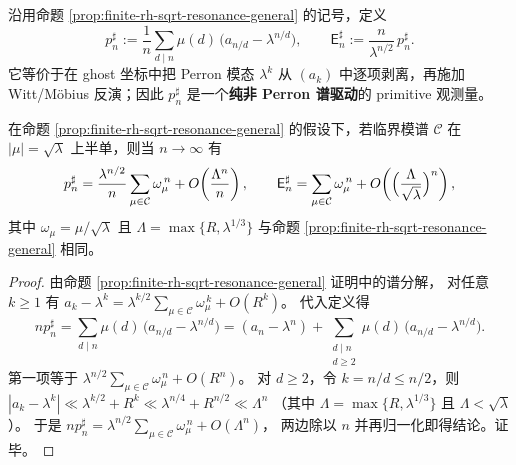 \begin{definition}\label{def:primitive-sharp}
沿用命题 \ref{prop:finite-rh-sqrt-resonance-general} 的记号，定义
\[
p_n^\sharp
:=\frac{1}{n}\sum_{d\mid n}\mu(d)\,\bigl(a_{n/d}-\lambda^{n/d}\bigr),
\qquad
\mathsf{E}_n^\sharp
:=\frac{n}{\lambda^{n/2}}\,p_n^\sharp.
\]
它等价于在 ghost 坐标中把 Perron 模态 \(\lambda^k\) 从 \((a_k)\) 中逐项剥离，再施加 Witt/Möbius 反演；因此 \(p_n^\sharp\) 是一个\textbf{纯非 Perron 谱驱动}的 primitive 观测量。
\end{definition}

\begin{proposition}\label{prop:primitive-sharp-phase-limit}
在命题 \ref{prop:finite-rh-sqrt-resonance-general} 的假设下，若临界模谱 \(\mathcal{C}\) 在 \(|\mu|=\sqrt{\lambda}\) 上半单，则当 \(n\to\infty\) 有
\[
p_n^\sharp
=\frac{\lambda^{n/2}}{n}\sum_{\mu\in\mathcal{C}}\omega_\mu^{\,n}
+O\!\left(\frac{\Lambda^n}{n}\right),
\qquad
\mathsf{E}_n^\sharp
=\sum_{\mu\in\mathcal{C}}\omega_\mu^{\,n}
+O\!\left(\Bigl(\frac{\Lambda}{\sqrt{\lambda}}\Bigr)^n\right),
\]
其中 \(\omega_\mu=\mu/\sqrt{\lambda}\) 且 \(\Lambda=\max\{R,\lambda^{1/3}\}\) 与命题 \ref{prop:finite-rh-sqrt-resonance-general} 相同。
\end{proposition}
\begin{proof}
由命题 \ref{prop:finite-rh-sqrt-resonance-general} 证明中的谱分解，
对任意 \(k\ge 1\) 有
\(
a_k-\lambda^k=\lambda^{k/2}\sum_{\mu\in\mathcal{C}}\omega_\mu^{\,k}+O(R^k)
\)。
代入定义得
\[
np_n^\sharp=\sum_{d\mid n}\mu(d)\,\bigl(a_{n/d}-\lambda^{n/d}\bigr)
=(a_n-\lambda^n)+\sum_{\substack{d\mid n\\ d\ge 2}}\mu(d)\,\bigl(a_{n/d}-\lambda^{n/d}\bigr).
\]
第一项等于 \(\lambda^{n/2}\sum_{\mu\in\mathcal{C}}\omega_\mu^{\,n}+O(R^n)\)。
对 \(d\ge 2\)，令 \(k=n/d\le n/2\)，则
\(
|a_k-\lambda^k|
\ll \lambda^{k/2}+R^k
\ll \lambda^{n/4}+R^{n/2}
\ll \Lambda^n
\)
（其中 \(\Lambda=\max\{R,\lambda^{1/3}\}\) 且 \(\Lambda<\sqrt{\lambda}\)）。
于是
\(
np_n^\sharp
=\lambda^{n/2}\sum_{\mu\in\mathcal{C}}\omega_\mu^{\,n}+O(\Lambda^n)
\)，
两边除以 \(n\) 并再归一化即得结论。证毕。
\end{proof}


